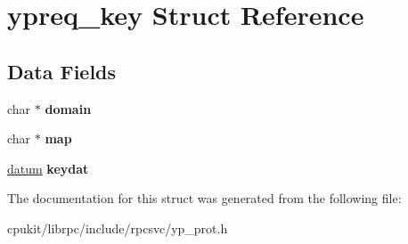 \hypertarget{structypreq__key}{}\section{ypreq\+\_\+key Struct Reference}
\label{structypreq__key}
\subsection*{Data Fields}
\begin{DoxyCompactItemize}
\item 
\mbox{\label{structypreq__key_a07579a3bd36094e3e134c73bf0bedb6d}} 
char $\ast$ {\bfseries domain}
\item 
\mbox{\label{structypreq__key_a634cf108a9c3decd8c4e3bf237e694c8}} 
char $\ast$ {\bfseries map}
\item 
\mbox{\label{structypreq__key_af5cac4af1210b010c22d1a6f50d481c5}} 
\mbox{\hyperlink{structdatum}{datum}} {\bfseries keydat}
\end{DoxyCompactItemize}


The documentation for this struct was generated from the following file\+:\begin{DoxyCompactItemize}
\item 
cpukit/librpc/include/rpcsvc/yp\+\_\+prot.\+h\end{DoxyCompactItemize}
